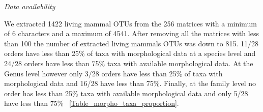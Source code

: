 \documentclass[12pt,letterpaper]{article}
\renewcommand{\subsection}[1]{%
\bigskip
\begin{center}
\begin{large}
\normalfont\itshape #1
\end{large}
\end{center}}
\begin{document}
\subsection{Data availability}
We extracted 1422 living mammal OTUs from the 256 matrices with a minimum of 6 characters and a maximum of 4541. After removing all the matrices with less than 100 the number of extracted living mammals OTUs was down to 815. 11/28 orders have less than 25\% of taxa with morphological data at a species level and 24/28 orders have less than 75\% taxa with available morphological data. At the Genus level however only 3/28 orders have less than 25\% of taxa with morphological data and 16/28 have less than 75\%. Finally, at the family level no order has less than 25\% taxa with available morphological data and only 5/28 have less than 75\% ~\ref{Table_morpho_taxa_proportion}.

\renewcommand\baselinestretch{1.2}\selectfont
\begin{center}

\label{Table_morpho_taxa_proportion}
\end{center}
\renewcommand\baselinestretch{2}\selectfont
\end{document}
